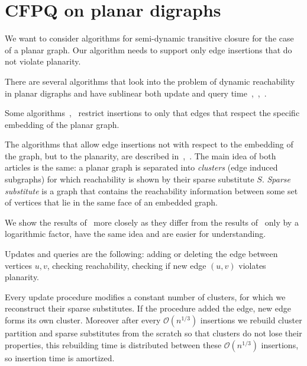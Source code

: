 \section{CFPQ on planar digraphs}

We want to consider algorithms for semi-dynamic transitive closure for the case of a planar graph. Our algorithm needs to support only edge insertions that do not violate planarity.

There are several algorithms that look into the problem of dynamic reachability in planar digraphs and have sublinear both update and query time~\cite{10.5555/647903.739284},~\cite{karczmarz2018data},~\cite{kao2008encyclopedia}. 

Some algorithms~\cite{10.5555/1778580.1778635},~\cite{karczmarz2018data} restrict insertions to only that edges that respect the specific embedding of the planar graph. 


The algorithms that allow edge insertions not with respect to the embedding of the graph, but to the planarity, are described in~\cite{10.5555/647903.739284},~\cite{10.1145/300515.300517}. The main idea of both articles is the same: a planar graph is separated into \textit{clusters} (edge induced subgraphs) for which reachability is shown by their sparse substitute $S$. \textit{Sparse substitute} is a graph that contains the reachability information between some set of vertices that lie in the same face of an embedded graph.

We show the results of~\cite{10.5555/647903.739284} more closely as they differ from the results of~\cite{10.1145/300515.300517} only by a logarithmic factor, have the same idea and are easier for understanding. 

Updates and queries are the following: adding or deleting the edge between vertices $u, v$, checking reachability, checking if new edge $(u, v)$ violates planarity. 

Every update procedure modifies a constant number of clusters, for which we reconstruct their sparse substitutes. If the procedure added the edge, new edge forms its own cluster. Moreover after every $\mathcal{O}(n^{1/3})$ insertions we rebuild cluster partition and sparse substitutes from the scratch so that clusters do not lose their properties, this rebuilding time is distributed between these $\mathcal{O}(n^{1/3})$ insertions, so insertion time is amortized. 

